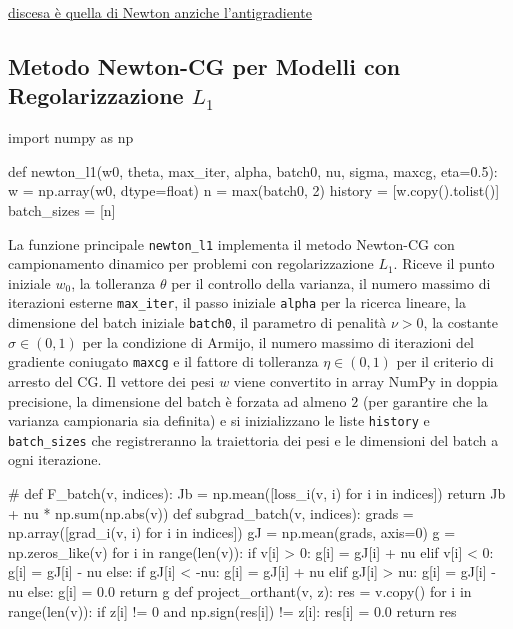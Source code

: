 \documentclass[a4paper,12pt]{article}
\begin{document}
 \underline{discesa è quella di Newton anziche l'antigradiente}

 \newpage
\subsection{Metodo Newton-CG per Modelli con \newline Regolarizzazione $L_1$}

\begin{pythoncode}[title= Newton-L1]

import numpy as np

def newton_l1(w0, theta, max_iter, alpha, batch0, nu, sigma, maxcg, eta=0.5):
    w = np.array(w0, dtype=float)
    n = max(batch0, 2)
    history     = [w.copy().tolist()]
    batch_sizes = [n]
\end{pythoncode}
La funzione principale \texttt{newton\_l1} implementa il metodo Newton-CG con campionamento dinamico per problemi con regolarizzazione $L_1$. Riceve il punto iniziale $w_0$, la tolleranza $\theta$ per il controllo della varianza, il numero massimo di iterazioni esterne \texttt{max\_iter}, il passo iniziale \texttt{alpha} per la ricerca lineare, la dimensione del batch iniziale \texttt{batch0}, il parametro di penalità $\nu > 0$, la costante $\sigma \in (0,1)$ per la condizione di Armijo, il numero massimo di iterazioni del gradiente coniugato \texttt{maxcg} e il fattore di tolleranza $\eta \in (0,1)$ per il criterio di arresto del CG. Il vettore dei pesi $w$ viene convertito in array NumPy in doppia precisione, la dimensione del batch è forzata ad almeno $2$ (per garantire che la varianza campionaria sia definita) e si inizializzano le liste \texttt{history} e \texttt{batch\_sizes} che registreranno la traiettoria dei pesi e le dimensioni del batch a ogni iterazione.
\begin{pythoncode}[title= Newton-L1]

#
    def F_batch(v, indices):
        Jb = np.mean([loss_i(v, i) for i in indices])
        return Jb + nu * np.sum(np.abs(v))
    def subgrad_batch(v, indices):
        grads = np.array([grad_i(v, i) for i in indices])
        gJ = np.mean(grads, axis=0)
        g = np.zeros_like(v)
        for i in range(len(v)):
            if v[i] > 0:
                g[i] = gJ[i] + nu
            elif v[i] < 0:
                g[i] = gJ[i] - nu
            else:
                if gJ[i] < -nu:
                    g[i] = gJ[i] + nu
                elif gJ[i] > nu:
                    g[i] = gJ[i] - nu
                else:
                    g[i] = 0.0
        return g
    def project_orthant(v, z):
        res = v.copy()
        for i in range(len(v)):
            if z[i] != 0 and np.sign(res[i]) != z[i]:
                res[i] = 0.0
        return res
\end{pythoncode}
\end{document}
